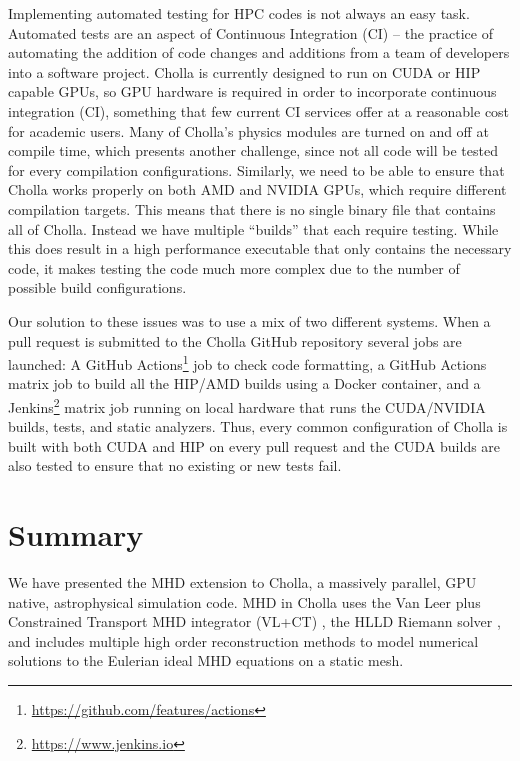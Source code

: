 \documentclass[modern, linenumbers]{aastex631}
\begin{document}
Implementing automated testing for HPC codes is not always an easy task. Automated tests are an aspect of Continuous Integration (CI) -- the practice of automating the addition of code changes and additions from a team of developers into a software project. Cholla is currently designed to run on CUDA or HIP capable GPUs, so GPU hardware is required in order to incorporate continuous integration (CI), something that few current CI services offer at a reasonable cost for academic users. Many of Cholla's physics modules are turned on and off at compile time, which presents another challenge, since not all code will be tested for every compilation configurations. Similarly, we need to be able to ensure that Cholla works properly on both AMD and NVIDIA GPUs, which require different compilation targets. This means that there is no single binary file that contains all of Cholla. Instead we have multiple ``builds'' that each require testing. While this does result in a high performance executable that only contains the necessary code, it makes testing the code much more complex due to the number of possible build configurations.

Our solution to these issues was to use a mix of two different systems. When a pull request is submitted to the Cholla GitHub repository several jobs are launched: A GitHub Actions\footnote{\url{https://github.com/features/actions}} job to check code formatting, a GitHub Actions matrix job to build all the HIP/AMD builds using a Docker container, and a Jenkins\footnote{\url{https://www.jenkins.io}} matrix job running on local hardware that runs the CUDA/NVIDIA builds, tests, and static analyzers. Thus, every common configuration of Cholla is built with both CUDA and HIP on every pull request and the CUDA builds are also tested to ensure that no existing or new tests fail.


\section{Summary}
\label{sec:summary}

We have presented the MHD extension to Cholla, a massively parallel, GPU native, astrophysical simulation code. MHD in Cholla uses the Van Leer plus Constrained Transport MHD integrator (VL+CT) \citep{stone_2009}, the HLLD Riemann solver \citep{hlld_2005}, and includes multiple high order reconstruction methods to model numerical solutions to the Eulerian ideal MHD equations on a static mesh.
\end{document}
